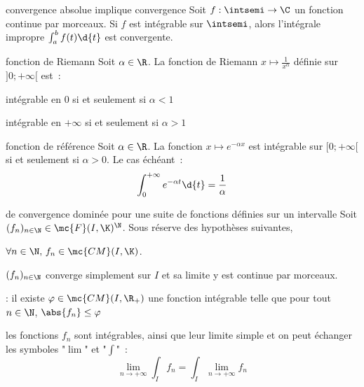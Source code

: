 \begin{adjustwidth}{-3cm}{-3cm}
\begin{theoreme}{12.16}{convergence absolue implique convergence}
    Soit $f:\intsemi \to \C$ un fonction continue par morceaux. Si $f$ est intégrable sur $\intsemi$, alors l'intégrale impropre $\int_a^b f(t)\d{t}$ est convergente.
\end{theoreme}

\begin{theoreme}{12.19}{fonction de Riemann}
    Soit $\alpha \in \R$. La fonction de Riemann $\displaystyle x \mapsto \frac{1}{x^\alpha}$ définie sur $]0 ; +\infty[$ est~:
    \begin{enumeratebf}
        \item intégrable en $0$ si et seulement si $\alpha < 1$
        \item intégrable en $+ \infty$ si et seulement si $\alpha > 1$
    \end{enumeratebf}
\end{theoreme}

\begin{theoreme}{12.20}{fonction de référence}
    Soit $\alpha \in \R$. La fonction $x \mapsto e^{-\alpha x}$ est intégrable sur $[0;+\infty[$ si et seulement si $\alpha > 0$. Le cas échéant~:
    $$\int_0^{+\infty}e^{-\alpha t} \d{t} = \frac{1}{\alpha}$$
\end{theoreme}

\begin{theoreme}{12.55}{de convergence dominée pour une suite de fonctions définies sur un intervalle}
    Soit $(f_n)_{n \in \N} \in \mc{F}(I,\K)^\N$. Sous réserve des hypothèses suivantes,
    \begin{enumeratebf}
        \item $\forall n \in \N,\, f_n \in \mc{CM}(I,\K)$.
        \item $(f_n)_{n \in \N}$ converge simplement sur $I$ et sa limite y est continue par morceaux.
        \item {} : il existe $\varphi \in \mc{CM}(I, \R_+)$ une fonction intégrable telle que pour tout $n \in \N$, $\abs{f_n} \leq \varphi$
    \end{enumeratebf}
    les fonctions $f_n$ sont intégrables, ainsi que leur limite simple et on peut échanger les symboles "$\lim$" et "$\int$"~:
    $$\lim_{n \to +\infty} \int_{I} f_n = \int_{I} \lim_{n \to +\infty} f_n $$
\end{theoreme}


\end{adjustwidth}
